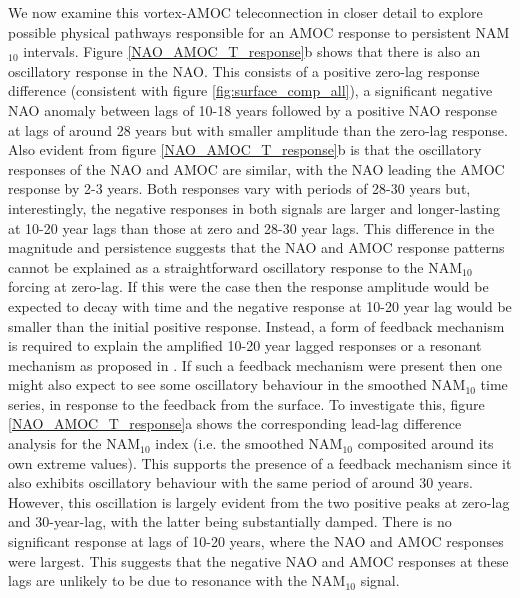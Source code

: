 We now examine this vortex-AMOC teleconnection in closer detail to explore possible physical pathways responsible for an AMOC response to persistent NAM$_{10}$ intervals. Figure \ref{NAO_AMOC_T_response}b shows that there is also an oscillatory response in the NAO. This consists of a positive zero-lag response difference (consistent with figure \ref{fig:surface_comp_all}), a significant negative NAO anomaly between lags of 10-18 years followed by a positive NAO response at lags of around 28 years but with smaller amplitude than the zero-lag response. Also evident from figure \ref{NAO_AMOC_T_response}b is that the oscillatory responses of the NAO and AMOC are similar, with the NAO leading the AMOC response by 2-3 years. Both responses vary with periods of 28-30 years but, interestingly, the negative responses in both signals are larger and longer-lasting at 10-20 year lags than those at zero and 28-30 year lags. This difference in the magnitude and persistence suggests that the NAO and AMOC response patterns cannot be explained as a straightforward oscillatory response to the NAM$_{10}$ forcing at zero-lag. If this were the case then the response amplitude would be expected to decay with time and the negative response at 10-20 year lag would be smaller than the initial positive response.  Instead, a form of feedback mechanism is required to explain  the amplified 10-20 year lagged responses or a resonant mechanism as proposed in \cite{reichlerStratospheric2012b}. If such a feedback mechanism were present then one might also expect to see some oscillatory behaviour in the smoothed NAM$_{10}$ time series, in response to the feedback from the surface. To investigate this, figure \ref{NAO_AMOC_T_response}a shows the corresponding lead-lag difference analysis for the NAM$_{10}$ index (i.e. the smoothed NAM$_{10}$ composited around its own extreme values). This supports the presence of a feedback mechanism since it also exhibits oscillatory behaviour with the same period of around 30 years. However, this oscillation is largely evident from the two positive peaks at zero-lag and 30-year-lag, with the latter being substantially damped. There is no significant response at lags of 10-20 years, where the NAO and AMOC responses were largest. This suggests that the negative NAO and AMOC responses at these lags are unlikely to be due to resonance with the NAM$_{10}$ signal. 
 

